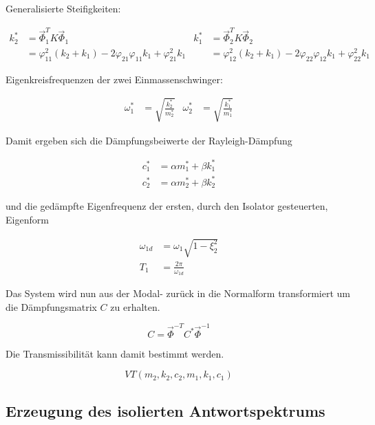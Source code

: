 Generalisierte Steifigkeiten:

\begin{align*}
k_2^* &= \vec{\Phi}_1^T K \vec{\Phi}_1                                                          &   k_1^* &= \vec{\Phi}_2^T K \vec{\Phi}_2\\
      &= \varphi_{11}^2 (k_2 + k_1) - 2 \varphi_{21} \varphi_{11} k_1 + \varphi_{21}^2 k_1      &         &= \varphi_{12}^2 (k_2 + k_1) - 2 \varphi_{22} \varphi_{12} k_1 + \varphi_{22}^2 k_1
\end{align*}

Eigenkreisfrequenzen der zwei Einmassenschwinger:

\begin{align*}
\omega_1^* &= \sqrt{\frac{k_2^*}{m_2^*}}  &  \omega_2^* &= \sqrt{\frac{k_1^*}{m_1^*}}
\end{align*}

Damit ergeben sich die Dämpfungsbeiwerte der Rayleigh-Dämpfung

\begin{align*}
c_1^* &= \alpha m_1^* + \beta k_1^*\\
c_2^* &= \alpha m_2^* + \beta k_2^*
\end{align*}

und die gedämpfte Eigenfrequenz der ersten, durch den Isolator gesteuerten, Eigenform  

\begin{align*}
\omega_{1d} &= \omega_1 \sqrt{1 - \xi_2^2}\\
T_1         &= \frac{2 \pi}{\omega_{1d}} 
\end{align*}

Das System wird nun aus der Modal- zurück in die Normalform transformiert um die Dämpfungsmatrix $C$ zu erhalten. \cite{Rayleigh}

\begin{equation*}
C = \vec{\Phi}^{-T} C^* \vec{\Phi}^{-1}
\end{equation*}

Die Transmissibilität kann damit bestimmt werden.

\begin{equation}
VT(m_2, k_2, c_2, m_1, k_1, c_1)
\end{equation}

\subsection{Erzeugung des isolierten Antwortspektrums}
\label{sec:transmAWS}

